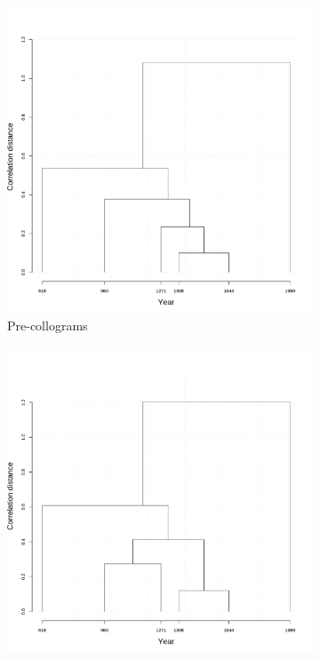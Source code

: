 \begin{figure}[H]
  \begin{subfigure}{0.3\textwidth}
    \includegraphics[width=\linewidth]{figures_new/VNC_lanbox/pre_collocate_df_VNC_cor.pdf}
    \caption{Pre-collograms}
  \end{subfigure}
  \quad
  \begin{subfigure}{0.3\textwidth}
    \includegraphics[width=\linewidth]{figures_new/VNC_lanbox/post_collocate_df_VNC_cor.pdf}

\end{subfigure}
\end{figure}
